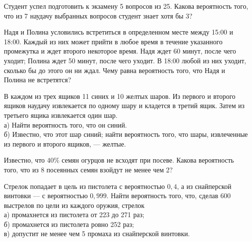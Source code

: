 \newpage\setcounter{zad}{0}



\begin{zkrW}{20}\noindent 
	Студент успел подготовить к экзамену 5 вопросов из 25. Какова вероятность того, что из 7 наудачу выбранных вопросов студент знает хотя бы 3?
 
\end{zkrW}

\begin{zkrW}{20}\noindent 
	Надя и Полина условились встретиться в определенном месте между 15:00 и 18:00. Каждый из них может прийти в любое время в течение указанного промежутка и ждет второго некоторое время. Надя ждет 60 минут, после чего уходит; Полина ждет 50 минут, после чего уходит. В 18:00 любой из них уходит, сколько бы до этого он ни ждал. Чему равна вероятность того, что Надя и Полина не встретятся?
 
\end{zkrW}

\begin{zkrW}{20}\noindent 
	В каждом из трех ящиков 11 синих и 10 желтых шаров. Из первого и второго ящиков наудачу извлекается по одному шару и кладется в третий ящик. Затем из третьего ящика извлекается один шар. \\ \indent а) Найти вероятность того, что он синий. \\ \indent б) Известно, что этот шар синий; найти вероятность того, что шары, извлеченные из первого и второго ящиков, --- желтые.
 
\end{zkrW}

\begin{zkrW}{20}\noindent 
	Известно, что $40\%$ семян огурцов не всходят при посеве. Какова вероятность того, что из 8 посеянных семян взойдут не менее чем 2?
 
\end{zkrW}

\begin{zkrW}{20}\noindent 
	Стрелок попадает в цель из пистолета с вероятностью $0{,}4$, а из снайперской винтовки --- с вероятностью $0{,}999$. Найти вероятность того, что, сделав 600 выстрелов по цели из каждого оружия, стрелок \\ \indent а) промахнется из пистолета от 223 до 271 раз; \\ \indent б) промахнется из пистолета ровно 252 раз; \\ \indent в) допустит не менее чем 5 промаха из снайперской винтовки.
 
\end{zkrW}


